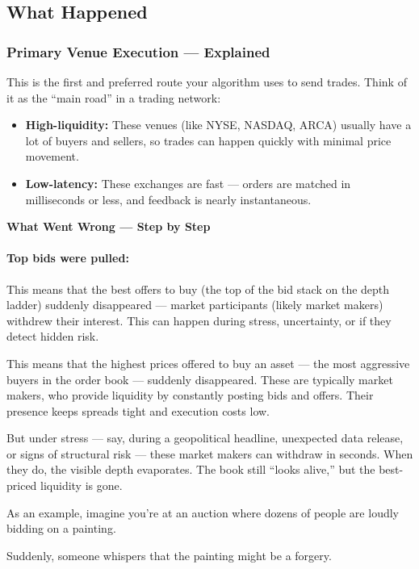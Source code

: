 
\subsection{What Happened}

\subsubsection{Primary Venue Execution — Explained}

This is the first and preferred route your algorithm uses to send trades. Think of it as the 
“main road” in a trading network:

\begin{itemize}
  \item \textbf{High-liquidity:} These venues (like NYSE, NASDAQ, ARCA) usually have a lot of buyers and 
  sellers, so trades can happen quickly with minimal price movement.
  \item \textbf{Low-latency:} These exchanges are fast — orders are matched in milliseconds or less, and 
  feedback is nearly instantaneous.
\end{itemize}

\textbf{What Went Wrong — Step by Step}

\paragraph{Top bids were pulled:} This means that the best offers to buy (the top of the bid stack on 
the depth ladder) suddenly disappeared — market participants (likely market makers) withdrew their interest. 
This can happen during stress, uncertainty, or if they detect hidden risk.

This means that the highest prices offered to buy an asset — the most aggressive buyers in the order book — 
suddenly disappeared. These are typically market makers, who provide liquidity by constantly posting bids and 
offers. Their presence keeps spreads tight and execution costs low.

But under stress — say, during a geopolitical headline, unexpected data release, or signs of structural risk — 
these market makers can withdraw in seconds. When they do, the visible depth evaporates. The book still “looks 
alive,” but the best-priced liquidity is gone.

As an example, imagine you're at an auction where dozens of people are loudly bidding on a painting.

Suddenly, someone whispers that the painting might be a forgery.

